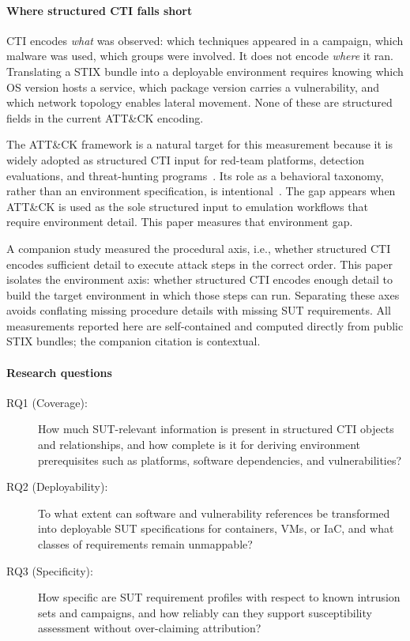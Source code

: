 \documentclass[sigconf,anonymous,review]{acmart}
\newcommand{\stix}{STIX\xspace}
\newcommand{\attack}{ATT\&CK\xspace}
\begin{document}
\paragraph{Where structured CTI falls short}

CTI encodes \emph{what} was observed: which techniques appeared in a campaign, which malware was used, which groups were involved. It does not encode \emph{where} it ran. Translating a \stix{} bundle into a deployable environment requires knowing which OS version hosts a service, which package version carries a vulnerability, and which network topology enables lateral movement. None of these are structured fields in the current \attack{} encoding.

The \attack{} framework is a natural target for this measurement because it is widely adopted as structured CTI input for red-team platforms, detection evaluations, and threat-hunting programs~\cite{strom2018mitre,DBLP:conf/uss/VirkudIR00024}. Its role as a behavioral taxonomy, rather than an environment specification, is intentional~\cite{strom2018mitre,ferraz2026proceduralsemanticsgapstructured}. The gap appears when \attack{} is used as the sole structured input to emulation workflows that require environment detail. This paper measures that environment gap.

A companion study measured the procedural axis, i.e., whether structured CTI encodes sufficient detail to execute attack steps in the correct order. This paper isolates the environment axis: whether structured CTI encodes enough detail to build the target environment in which those steps can run. Separating these axes avoids conflating missing procedure details with missing SUT requirements. All measurements reported here are self-contained and computed directly from public STIX bundles; the companion citation is contextual.

\paragraph{Research questions}

\begin{description}
\item[RQ1 (Coverage):] How much SUT-relevant information is present in structured CTI objects and relationships, and how complete is it for deriving environment prerequisites such as platforms, software dependencies, and vulnerabilities?
\item[RQ2 (Deployability):] To what extent can software and vulnerability references be transformed into deployable SUT specifications for containers, VMs, or IaC, and what classes of requirements remain unmappable?
\item[RQ3 (Specificity):] How specific are SUT requirement profiles with respect to known intrusion sets and campaigns, and how reliably can they support susceptibility assessment without over-claiming attribution?
\end{description}
\end{document}

